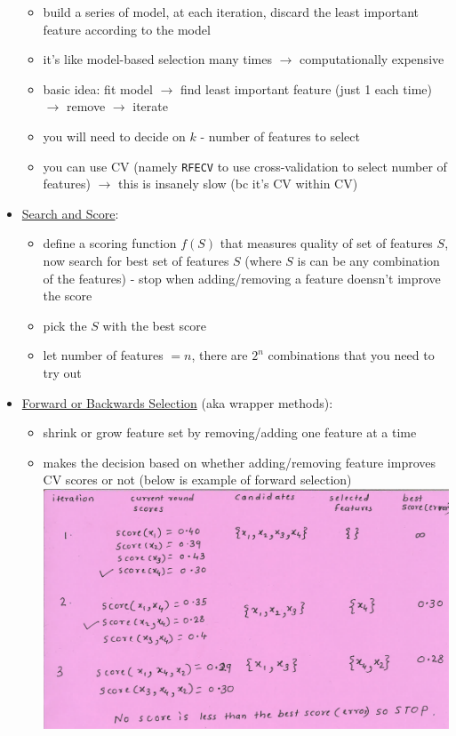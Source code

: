 \documentclass[10.5pt,a4paper, fleqn, dvipsnames]{article}
\begin{document}
\begin{itemize}
    \begin{itemize}
        \item build a series of model, at each iteration, discard the least important feature according to the model 
        \item it's like model-based selection many times $\rightarrow$ computationally expensive 
        \item basic idea: fit model $\rightarrow$ find least important feature (just 1 each time) $\rightarrow$ remove $\rightarrow$ iterate
        \item you will need to decide on $k$ - number of features to select
        \item you can use CV (namely \lstinline{RFECV} to use cross-validation to select number of features) $\rightarrow$ this is insanely slow (bc it's CV within CV)
    \end{itemize}
    \item \ul{Search and Score}:
    \begin{itemize}
        \item define a scoring function $f(S)$ that measures quality of set of features $S$, now search for best set of features $S$ (where $S$ is can be any combination of the features) - stop when adding/removing a feature doensn't improve the score
        \item pick the $S$ with the best score
        \item let number of features $= n$, there are $2^n$ combinations that you need to try out
    \end{itemize}
    \item \ul{Forward or Backwards Selection} (aka wrapper methods):
    \begin{itemize}
        \item shrink or grow feature set by removing/adding one feature at a time 
        \item makes the decision based on whether adding/removing feature improves CV scores or not (below is example of forward selection)\\
        \includegraphics[scale = 0.3]{forward-selection.png}

\end{itemize}
\end{itemize}
\end{document}
